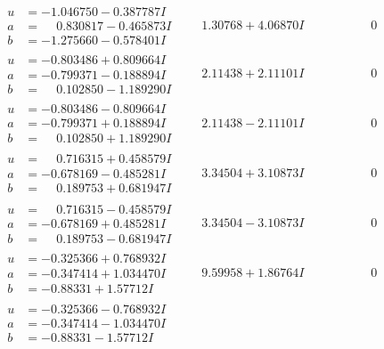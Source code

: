 \documentclass[1p]{elsarticle_modified}
\theoremstyle{definition}
\begin{document}
$$\begin{array}{c|c|c}
\begin{aligned}
u &= -1.046750 - 0.387787 I \\
a &= \phantom{-}0.830817 - 0.465873 I \\
b &= -1.275660 - 0.578401 I\end{aligned}
 & \phantom{-}1.30768 + 4.06870 I & \phantom{-0.000000 } 0 \\ \hline\begin{aligned}
u &= -0.803486 + 0.809664 I \\
a &= -0.799371 - 0.188894 I \\
b &= \phantom{-}0.102850 - 1.189290 I\end{aligned}
 & \phantom{-}2.11438 + 2.11101 I & \phantom{-0.000000 } 0 \\ \hline\begin{aligned}
u &= -0.803486 - 0.809664 I \\
a &= -0.799371 + 0.188894 I \\
b &= \phantom{-}0.102850 + 1.189290 I\end{aligned}
 & \phantom{-}2.11438 - 2.11101 I & \phantom{-0.000000 } 0 \\ \hline\begin{aligned}
u &= \phantom{-}0.716315 + 0.458579 I \\
a &= -0.678169 - 0.485281 I \\
b &= \phantom{-}0.189753 + 0.681947 I\end{aligned}
 & \phantom{-}3.34504 + 3.10873 I & \phantom{-0.000000 } 0 \\ \hline\begin{aligned}
u &= \phantom{-}0.716315 - 0.458579 I \\
a &= -0.678169 + 0.485281 I \\
b &= \phantom{-}0.189753 - 0.681947 I\end{aligned}
 & \phantom{-}3.34504 - 3.10873 I & \phantom{-0.000000 } 0 \\ \hline\begin{aligned}
u &= -0.325366 + 0.768932 I \\
a &= -0.347414 + 1.034470 I \\
b &= -0.88331 + 1.57712 I\end{aligned}
 & \phantom{-}9.59958 + 1.86764 I & \phantom{-0.000000 } 0 \\ \hline\begin{aligned}
u &= -0.325366 - 0.768932 I \\
a &= -0.347414 - 1.034470 I \\
b &= -0.88331 - 1.57712 I\end{aligned}

\end{array}$$
\end{document}
